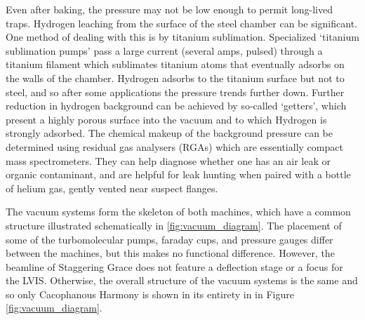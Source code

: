 	Even after baking, the pressure may not be low enough to permit long-lived traps. Hydrogen leaching from the surface of the steel chamber can be significant. One method of dealing with this is by titanium sublimation. Specialized `titanium sublimation pumps' pass a large current (several amps, pulsed) through a titanium filament which sublimates titanium atoms that eventually adsorbs on the walls of the chamber. Hydrogen adsorbs to the titanium surface but not to steel, and so after some applications the pressure trends further down. Further reduction in hydrogen background can be achieved by so-called `getters', which present a highly porous surface into the vacuum and to which Hydrogen is strongly adsorbed. The chemical makeup of the background pressure can be determined using residual gas analysers (RGAs) which are essentially compact mass spectrometers. They can help diagnose whether one has an air leak or organic contaminant, and are helpful for leak hunting when paired with a bottle of helium gas, gently vented near suspect flanges.

	The vacuum systems form the skeleton of both machines, which have a common structure illustrated schematically in \ref{fig:vacuum_diagram}. The placement of some of the turbomolecular pumps, faraday cups, and pressure gauges differ between the machines, but this makes no functional difference. However, the beamline of Staggering Grace does not feature a deflection stage or a focus for the LVIS. Otherwise, the overall structure of the vacuum systems is the same and so only Cacophanous Harmony is shown in its entirety in in Figure \ref{fig:vacuum_diagram}. 


